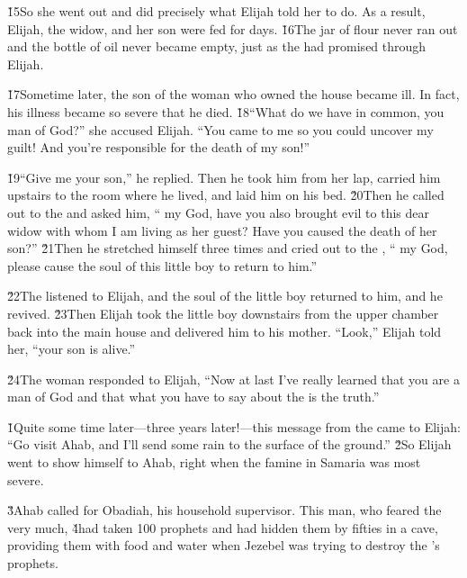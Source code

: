 \v{15}So she went out and did precisely what Elijah told her to do. As a result, Elijah, the widow, and her son were fed for days. \v{16}The jar of flour never ran out and the bottle of oil never became empty, just as the  had promised through Elijah.

\v{17}Sometime later, the son of the woman who owned the house became ill. In fact, his illness became so severe that he died. \v{18}``What do we have in common, you man of God?'' she accused Elijah. ``You came to me so you could uncover my guilt! And you're responsible for the death of my son!''

\v{19}``Give me your son,'' he replied. Then he took him from her lap, carried him upstairs to the room where he lived, and laid him on his bed. \v{20}Then he called out to the  and asked him, `` my God, have you also brought evil to this dear widow with whom I am living as her guest? Have you caused the death of her son?'' \v{21}Then he stretched himself three times and cried out to the , `` my God, please cause the soul of this little boy to return to him.''

\v{22}The  listened to Elijah, and the soul of the little boy returned to him, and he revived. \v{23}Then Elijah took the little boy downstairs from the upper chamber back into the main house and delivered him to his mother. ``Look,'' Elijah told her, ``your son is alive.''

\v{24}The woman responded to Elijah, ``Now at last I've really learned that you are a man of God and that what you have to say about the  is the truth.''

\v{1}Quite some time later---three years later!---this message from the  came to Elijah: ``Go visit Ahab, and I'll send some rain to the surface of the ground.'' \v{2}So Elijah went to show himself to Ahab, right when the famine in Samaria was most severe.

\v{3}Ahab called for Obadiah, his household supervisor. This man, who feared the  very much, \v{4}had taken 100 prophets and had hidden them by fifties in a cave, providing them with food and water when Jezebel was trying to destroy the 's prophets.

